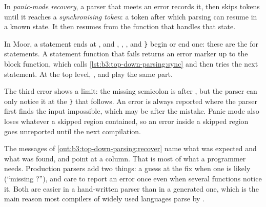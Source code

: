\begin{definition}\label{def:b3:top-down-parsing:recovery}
In \emph{panic-mode recovery}, a parser that meets an error records it, then skips tokens until it reaches a \emph{synchronising token}: a token after which parsing can resume in a known state. It then resumes from the function that handles that state.
\end{definition}

In Moor, a statement ends at \code{;}, and , , ,  and \texttt{\}} begin or end one: these are the  for statements. A statement function that fails returns an error marker up to the block function, which calls \cref{lst:b3:top-down-parsing:sync} and then tries the next statement. At the top level, ,  and  play the same part.

\label{lst:b3:top-down-parsing:sync}

\label{lst:b3:top-down-parsing:errors}
\label{out:b3:top-down-parsing:recover}

The third error shows a limit: the missing semicolon is after , but the parser can only notice it at the \texttt{\}} that follows. An error is always reported where the parser first finds the input impossible, which may be after the mistake. Panic mode also loses whatever a skipped region contained, so an error inside a skipped region goes unreported until the next compilation.

\begin{inpractice}
The messages of \cref{out:b3:top-down-parsing:recover} name what was expected and what was found, and point at a column. That is most of what a programmer needs. Production parsers add two things: a guess at the fix when one is likely (``missing \code{;}?''), and care to report an error once even when several functions notice it. Both are easier in a hand-written parser than in a generated one, which is the main reason most compilers of widely used languages parse by .
\end{inpractice}

